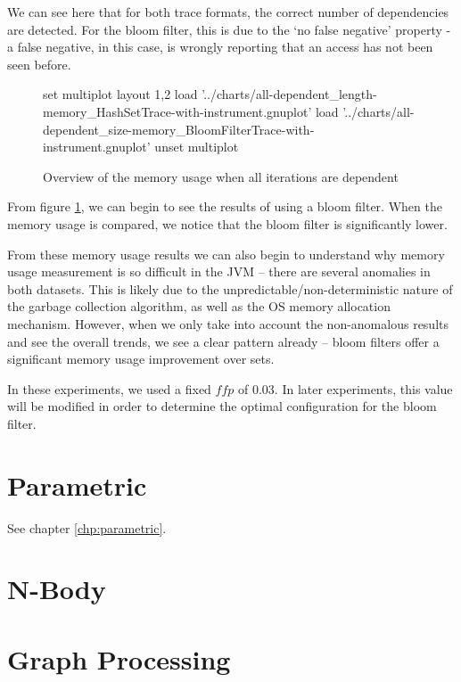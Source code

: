 	We can see here that for both trace formats, the correct number of dependencies are detected. For the bloom filter, this is due to the `no false negative' property - a false negative, in this case, is wrongly reporting that an access has not been seen before.
	
	\begin{figure}[H]
		\begin{gnuplot}[terminal=pdf]
		set multiplot layout 1,2
			load '../charts/all-dependent_length-memory_HashSetTrace-with-instrument.gnuplot'
			load '../charts/all-dependent_size-memory_BloomFilterTrace-with-instrument.gnuplot'
					unset multiplot
		\end{gnuplot}
		\caption{Overview of the memory usage when all iterations are dependent}
		\label{chart:all-dependent-memory-comparison}
	\end{figure}
	
	From figure \ref{chart:all-dependent-memory-comparison}, we can begin to see the results of using a bloom filter. When the memory usage is compared, we notice that the bloom filter is significantly lower.
	
	From these memory usage results we can also begin to understand why memory usage measurement is so difficult in the JVM -- there are several anomalies in both datasets. This is likely due to the unpredictable/non-deterministic nature of the garbage collection algorithm, as well as the OS memory allocation mechanism. However, when we only take into account the non-anomalous results and see the overall trends, we see a clear pattern already -- bloom filters offer a significant memory usage improvement over sets.
	
	In these experiments, we used a fixed $ffp$ of 0.03. In later experiments, this value will be modified in order to determine the optimal configuration for the bloom filter.
	

\section{Parametric} \label{sec:results/parametric}
See chapter \ref{chp:parametric}.

\section{N-Body} \label{sec:results/nbody}

\section{Graph Processing} \label{sec:results/graph}

